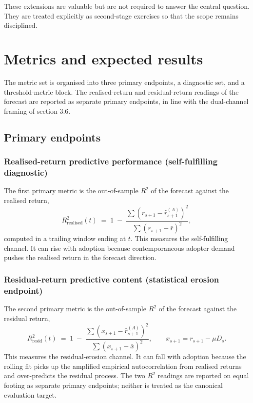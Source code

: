 \documentclass[11pt]{article}
\begin{document}
These extensions are valuable but are not required to answer the central question. They are treated explicitly as second-stage exercises so that the scope remains disciplined.


\section{Metrics and expected results}

The metric set is organised into three primary endpoints, a diagnostic set, and a threshold-metric block. The realised-return and residual-return readings of the forecast are reported as separate primary endpoints, in line with the dual-channel framing of section 3.6.

\subsection{Primary endpoints}

\subsubsection{Realised-return predictive performance (self-fulfilling diagnostic)}

The first primary metric is the out-of-sample $R^{2}$ of the forecast against the realised return,
\begin{equation*}
  R^{2}_{\mathrm{realised}}(t) \;=\; 1 \;-\; \frac{\sum (r_{s+1} - \hat{r}^{(A)}_{s+1})^{2}}{\sum (r_{s+1} - \bar{r})^{2}},
\end{equation*}
computed in a trailing window ending at $t$. This measures the self-fulfilling channel. It can rise with adoption because contemporaneous adopter demand pushes the realised return in the forecast direction.

\subsubsection{Residual-return predictive content (statistical erosion endpoint)}

The second primary metric is the out-of-sample $R^{2}$ of the forecast against the residual return,
\begin{equation*}
  R^{2}_{\mathrm{resid}}(t) \;=\; 1 \;-\; \frac{\sum (x_{s+1} - \hat{r}^{(A)}_{s+1})^{2}}{\sum (x_{s+1} - \bar{x})^{2}}, \qquad x_{s+1} = r_{s+1} - \mu D_{s}.
\end{equation*}
This measures the residual-erosion channel. It can fall with adoption because the rolling fit picks up the amplified empirical autocorrelation from realised returns and over-predicts the residual process. The two $R^{2}$ readings are reported on equal footing as separate primary endpoints; neither is treated as the canonical evaluation target.
\end{document}
